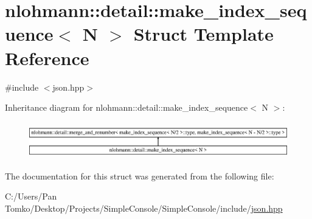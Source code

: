 \hypertarget{structnlohmann_1_1detail_1_1make__index__sequence}{}\section{nlohmann\+::detail\+::make\+\_\+index\+\_\+sequence$<$ N $>$ Struct Template Reference}
\label{structnlohmann_1_1detail_1_1make__index__sequence}


{\ttfamily \#include $<$json.\+hpp$>$}

Inheritance diagram for nlohmann\+::detail\+::make\+\_\+index\+\_\+sequence$<$ N $>$\+:\begin{figure}[H]
\begin{center}
\leavevmode
\includegraphics[height=1.597718cm]{d9/d0e/structnlohmann_1_1detail_1_1make__index__sequence}
\end{center}
\end{figure}


The documentation for this struct was generated from the following file\+:\begin{DoxyCompactItemize}
\item 
C\+:/\+Users/\+Pan Tomko/\+Desktop/\+Projects/\+Simple\+Console/\+Simple\+Console/include/\mbox{\hyperlink{json_8hpp}{json.\+hpp}}\end{DoxyCompactItemize}
